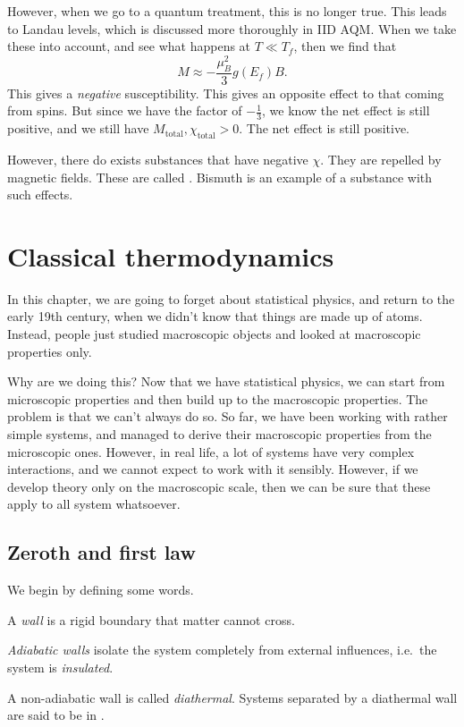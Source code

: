 \documentclass[a4paper]{article}
\begin{document}
However, when we go to a quantum treatment, this is no longer true. This leads to Landau levels, which is discussed more thoroughly in IID AQM. When we take these into account, and see what happens at $T \ll T_f$, then we find that
\[
  M \approx - \frac{\mu_B^2}{3} g(E_f) B.
\]
This gives a \emph{negative} susceptibility. This gives an opposite effect to that coming from spins. But since we have the factor of $-\frac{1}{3}$, we know the net effect is still positive, and we still have $M_{\mathrm{total}}, \chi_{\mathrm{total}} > 0$. The net effect is still positive.

However, there do exists substances that have negative $\chi$. They are repelled by magnetic fields. These are called . Bismuth is an example of a substance with such effects.

\section{Classical thermodynamics}
In this chapter, we are going to forget about statistical physics, and return to the early 19th century, when we didn't know that things are made up of atoms. Instead, people just studied macroscopic objects and looked at macroscopic properties only.

Why are we doing this? Now that we have statistical physics, we can start from microscopic properties and then build up to the macroscopic properties. The problem is that we can't always do so. So far, we have been working with rather simple systems, and managed to derive their macroscopic properties from the microscopic ones. However, in real life, a lot of systems have very complex interactions, and we cannot expect to work with it sensibly. However, if we develop theory only on the macroscopic scale, then we can be sure that these apply to all system whatsoever.

\subsection{Zeroth and first law}
We begin by defining some words.

\begin{defi}[Wall]
  A \emph{wall} is a rigid boundary that matter cannot cross.
\end{defi}

\begin{defi}
  \emph{Adiabatic walls} isolate the system completely from external influences, i.e.\ the system is \emph{insulated}.
\end{defi}
\begin{defi}
  A non-adiabatic wall is called \emph{diathermal}. Systems separated by a diathermal wall are said to be in .
\end{defi}
\end{document}
